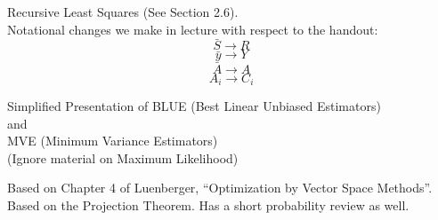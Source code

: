 \documentclass[12pt,letterpaper,headings=normal]{scrartcl}
\begin{document}
\vspace*{\fill}
Recursive Least Squares (See Section 2.6). \\
Notational changes we make in lecture with respect to the handout:\\
$$\bar{S} \to R$$
$$\bar{y} \to Y$$
$$\bar{A} \to A$$
$$A_i \to C_i$$
\vspace*{\fill}

\vspace*{\fill}
Simplified Presentation of BLUE (Best Linear Unbiased Estimators) \\and \\MVE (Minimum Variance Estimators)\\
(Ignore material on Maximum Likelihood)
\vspace*{\fill}

\vspace*{\fill}
Based on Chapter 4 of Luenberger, ``Optimization by Vector Space Methods''. Based on the Projection Theorem. Has a short probability review as well.
\vspace*{\fill}

\end{document}
